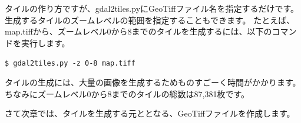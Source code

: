 タイルの作り方ですが、gdal2tiles.pyにGeoTiffファイル名を指定するだけです。
生成するタイルのズームレベルの範囲を指定することもできます。
たとえば、map.tiffから、ズームレベル0から8までのタイルを生成するには、以下のコマンドを実行します。

\texttt{\$ gdal2tiles.py -z 0-8 map.tiff}

タイルの生成には、大量の画像を生成するためものすごーく時間がかかります。
ちなみにズームレベル0から8までのタイルの総数は87,381枚です。

さて次章では、タイルを生成する元ととなる、GeoTiffファイルを作成します。
